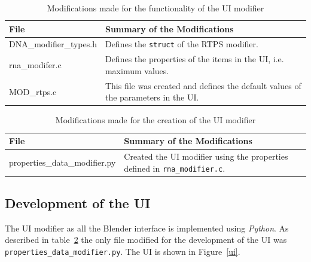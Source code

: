 \begin{table}[htdp]
\caption{Modifications made for the functionality of the UI modifier}
\begin{center}
\begin{tabular}{|p{6cm}|p{6cm}|}
\hline 
\textbf{File} & \textbf{Summary of the Modifications} \\\hline 
DNA\_modifier\_types.h & Defines the \texttt{struct} of the RTPS modifier. \\\hline 
rna\_modifer.c & Defines the properties of the items in the UI, i.e. maximum values. \\\hline 
MOD\_rtps.c & This file was created and defines the default values of the parameters in the UI. \\
\hline 
\end{tabular}
\end{center}
\label{funcTable}
\end{table}

\begin{table}[htdp]
\caption{Modifications made for the creation of the UI modifier}
\begin{center}
\begin{tabular}{|p{6cm}|p{6cm}|}
\hline 
\textbf{File} & \textbf{Summary of the Modifications} \\\hline 
properties\_data\_modifier.py & Created the UI modifier using the properties defined in \texttt{rna\_modifier.c}. \\
\hline 
\end{tabular}
\end{center}
\label{uiTable}
\end{table}

\subsection{Development of the UI}
The UI modifier as all the Blender interface is implemented using \textit{Python}. As described in table~\ref{uiTable} the only file modified for the development of the UI was \texttt{properties\_data\_modifier.py}. The UI is shown in Figure~\ref{ui}.

